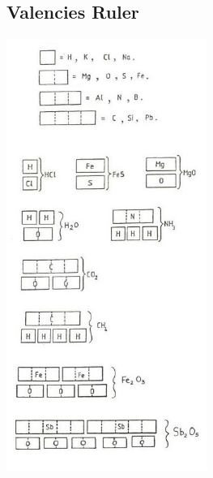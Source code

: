 \begin{multicols}{2}
\vfill
\columnbreak




\subsection{Valencies Ruler}

\begin{center}
\includegraphics[width=0.49\textwidth]{./img/source/valency-ruler.jpg}
\end{center}


\end{multicols}
